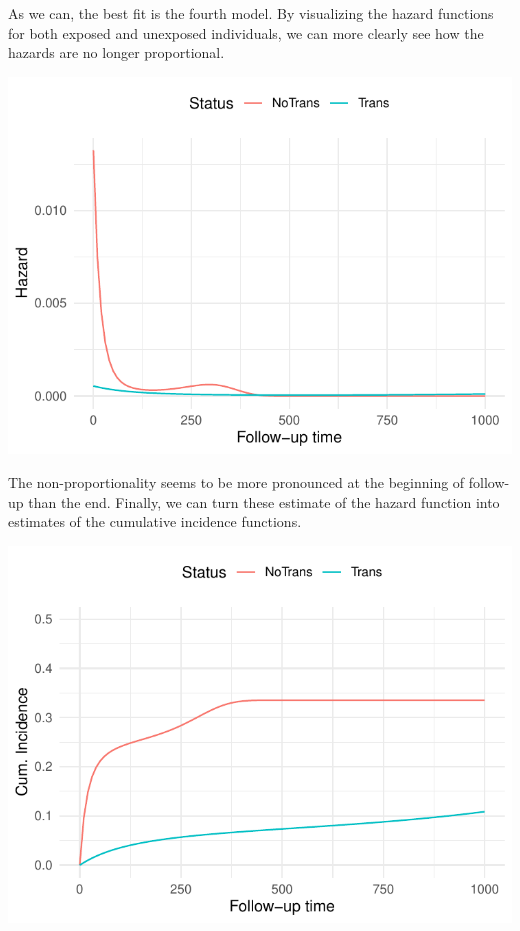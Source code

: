 \documentclass[
]{jss}
\begin{document}
As we can, the best fit is the fourth model. By visualizing the hazard
functions for both exposed and unexposed individuals, we can more
clearly see how the hazards are no longer proportional.

\begin{CodeChunk}


\begin{center}\includegraphics{../figures/stanford-hazard-1} \end{center}

\end{CodeChunk}

The non-proportionality seems to be more pronounced at the beginning of
follow-up than the end. Finally, we can turn these estimate of the
hazard function into estimates of the cumulative incidence functions.

\begin{CodeChunk}


\begin{center}\includegraphics{../figures/stanford-risk-1} \end{center}

\end{CodeChunk}
\end{document}
